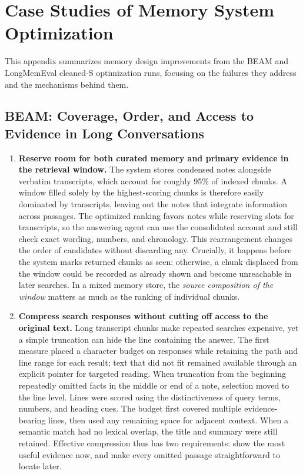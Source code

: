 \section{Case Studies of Memory System Optimization}

This appendix summarizes memory design improvements from the BEAM and LongMemEval cleaned-S optimization runs, focusing on the failures they address and the mechanisms behind them.

\subsection{BEAM: Coverage, Order, and Access to Evidence in Long Conversations}

\begin{enumerate}
\item \textbf{Reserve room for both curated memory and primary evidence in the retrieval window.} The system stores condensed notes alongside verbatim transcripts, which account for roughly 95\% of indexed chunks. A window filled solely by the highest-scoring chunks is therefore easily dominated by transcripts, leaving out the notes that integrate information across passages. The optimized ranking favors notes while reserving slots for transcripts, so the answering agent can use the consolidated account and still check exact wording, numbers, and chronology. This rearrangement changes the order of candidates without discarding any. Crucially, it happens before the system marks returned chunks as seen: otherwise, a chunk displaced from the window could be recorded as already shown and become unreachable in later searches. In a mixed memory store, the \emph{source composition of the window} matters as much as the ranking of individual chunks.

\item \textbf{Compress search responses without cutting off access to the original text.} Long transcript chunks make repeated searches expensive, yet a simple truncation can hide the line containing the answer. The first measure placed a character budget on responses while retaining the path and line range for each result; text that did not fit remained available through an explicit pointer for targeted reading. When truncation from the beginning repeatedly omitted facts in the middle or end of a note, selection moved to the line level. Lines were scored using the distinctiveness of query terms, numbers, and heading cues. The budget first covered multiple evidence-bearing lines, then used any remaining space for adjacent context. When a semantic match had no lexical overlap, the title and summary were still retained. Effective compression thus has two requirements: show the most useful evidence now, and make every omitted passage straightforward to locate later.


\end{enumerate}
